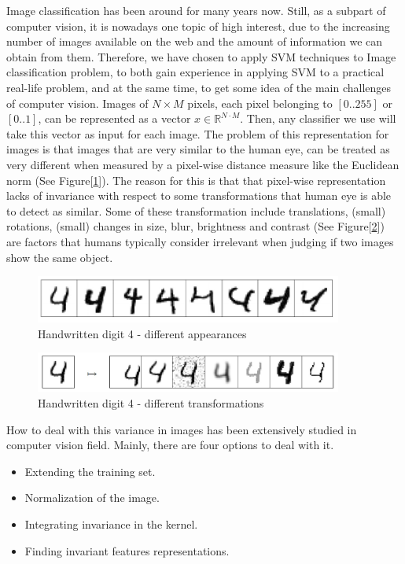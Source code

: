 Image classification has been around for many years now. Still, as a subpart of computer vision, it is nowadays one topic of high interest, due to the increasing number of images available on the web and the amount of information we can obtain from them.  Therefore, we have chosen to apply SVM techniques to Image classification problem, to both gain experience in applying SVM to a practical real-life problem, and at the same time, to get some idea of the main challenges of computer vision. 
Images of $N\times M$ pixels, each pixel belonging to $[0..255]$ or $[0..1]$, can be represented as a vector $x \in \mathbb{R}^{N\cdot M}$. Then, any classifier we use will take this vector as input for each image. The problem of this representation for images is that images that are very similar to the human eye, can be treated as very different when measured by a pixel-wise distance measure like the Euclidean norm (See Figure[\ref{fig:handwrite}]).  The reason for this is that that pixel-wise representation lacks of invariance with respect to some transformations that human eye is able to detect as similar. Some of these transformation include translations, (small) rotations, (small) changes in size, blur, brightness and contrast (See Figure[\ref{fig:handwriteinvar}]) are factors that humans typically consider irrelevant when judging if two images show the same object. 
\begin{figure}[!h]
    \centering
    \includegraphics[width=0.9\textwidth]{Images/handwrite4.jpg}
    \caption{Handwritten digit 4 - different appearances}
    \label{fig:handwrite}
\end{figure}
\begin{figure}[!h]
    \centering
    \includegraphics[width=0.9\textwidth]{Images/handwrite4transformations.jpg}
    \caption{Handwritten digit 4 - different transformations}
    \label{fig:handwriteinvar}
\end{figure}
How to deal with this variance in images has been extensively studied in computer vision field. Mainly, there are four options to deal with it. 
\begin{itemize}
    \item Extending the training set. 
    \item Normalization of the image. 
    \item Integrating invariance in the kernel. 
    \item Finding invariant features representations. 
\end{itemize}

